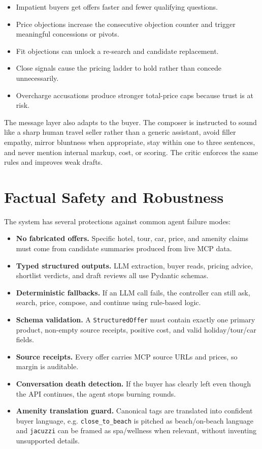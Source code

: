 \documentclass[10pt,a4paper]{article}
\begin{document}
\begin{itemize}
  \item Impatient buyers get offers faster and fewer qualifying questions.
  \item Price objections increase the consecutive objection counter and trigger meaningful concessions or pivots.
  \item Fit objections can unlock a re-search and candidate replacement.
  \item Close signals cause the pricing ladder to hold rather than concede unnecessarily.
  \item Overcharge accusations produce stronger total-price caps because trust is at risk.
\end{itemize}

The message layer also adapts to the buyer. The composer is instructed to sound like a sharp human travel seller rather than a generic assistant, avoid filler empathy, mirror bluntness when appropriate, stay within one to three sentences, and never mention internal markup, cost, or scoring. The critic enforces the same rules and improves weak drafts.

\section*{Factual Safety and Robustness}
The system has several protections against common agent failure modes:

\begin{itemize}
  \item \textbf{No fabricated offers.} Specific hotel, tour, car, price, and amenity claims must come from candidate summaries produced from live MCP data.
  \item \textbf{Typed structured outputs.} LLM extraction, buyer reads, pricing advice, shortlist verdicts, and draft reviews all use Pydantic schemas.
  \item \textbf{Deterministic fallbacks.} If an LLM call fails, the controller can still ask, search, price, compose, and continue using rule-based logic.
  \item \textbf{Schema validation.} A \texttt{StructuredOffer} must contain exactly one primary product, non-empty source receipts, positive cost, and valid holiday/tour/car fields.
  \item \textbf{Source receipts.} Every offer carries MCP source URLs and prices, so margin is auditable.
  \item \textbf{Conversation death detection.} If the buyer has clearly left even though the API continues, the agent stops burning rounds.
  \item \textbf{Amenity translation guard.} Canonical tags are translated into confident buyer language, e.g. \texttt{close\_to\_beach} is pitched as beach/on-beach language and \texttt{jacuzzi} can be framed as spa/wellness when relevant, without inventing unsupported details.
\end{itemize}
\end{document}
